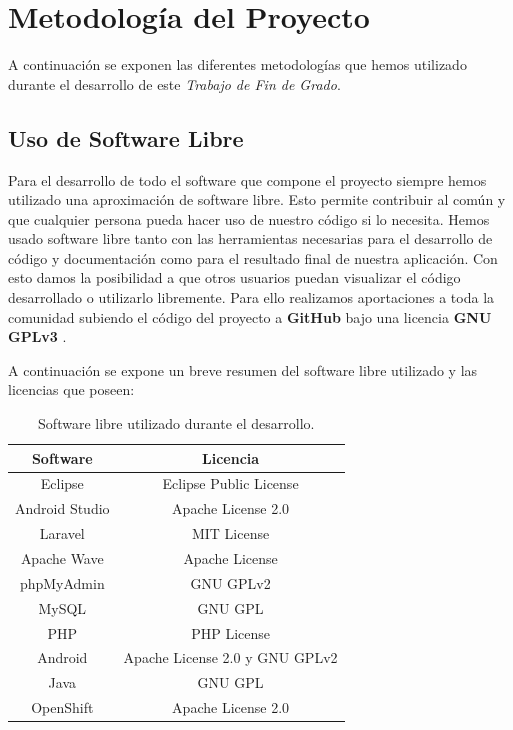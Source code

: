 \newpage
\thispagestyle{sectioned}
\chapter{Metodología del Proyecto}

A continuación se exponen las diferentes metodologías que hemos utilizado durante el desarrollo de este \textit{Trabajo de Fin de Grado}.

\section{Uso de Software Libre}

Para el desarrollo de todo el software que compone el proyecto siempre hemos utilizado una aproximación de software libre. Esto permite contribuir al común y que cualquier persona pueda hacer uso de nuestro código si lo necesita. Hemos usado software libre tanto con las herramientas necesarias para el desarrollo de código y documentación como para el resultado final de nuestra aplicación. Con esto damos la posibilidad a que otros usuarios puedan visualizar el código desarrollado o utilizarlo libremente. Para ello realizamos aportaciones a toda la comunidad subiendo el código del proyecto a \textbf{GitHub} bajo una licencia \textbf{GNU GPLv3} \cite{ref:GPLv3}.

A continuación se expone un breve resumen del software libre utilizado y las licencias que poseen:

\begin{table}[h]
\centering
\begin{tabular}{|c|c|}
\hline
{\bf Software} & {\bf Licencia}                 \\ \hline
Eclipse        & Eclipse Public License         \\ \hline
Android Studio & Apache License 2.0             \\ \hline
Laravel        & MIT License                    \\ \hline
Apache Wave    & Apache License                 \\ \hline
phpMyAdmin     & GNU GPLv2                      \\ \hline
MySQL          & GNU GPL                        \\ \hline
PHP            & PHP License                    \\ \hline
Android        & Apache License 2.0 y GNU GPLv2 \\ \hline
Java           & GNU GPL                        \\ \hline
OpenShift      & Apache License 2.0             \\ \hline
\end{tabular}
\caption{Software libre utilizado durante el desarrollo.}
\end{table}

